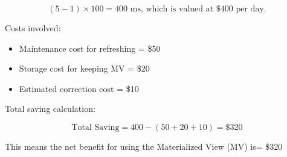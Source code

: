\[
(5 - 1) \times 100 = 400 \text{ ms, which is valued at } \$400 \text{ per day.}
\]

Costs involved:
\begin{itemize}
    \item Maintenance cost for refreshing = \$50
    \item Storage cost for keeping MV = \$20
    \item Estimated correction cost = \$10
\end{itemize}

Total saving calculation:

\[
\text{Total Saving} = 400 - (50 + 20 + 10) = \$320
\]

This means the net benefit for using the Materialized View (MV) is= \$320